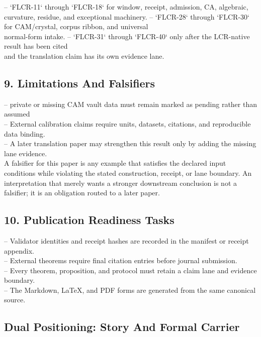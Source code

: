 \documentclass[11pt]{article}
\begin{document}
\noindent{}-- `FLCR-11` through `FLCR-18` for window, receipt, admission, CA, algebraic,\\
  curvature, residue, and exceptional machinery.
\noindent{}-- `FLCR-28` through `FLCR-30` for CAM/crystal, corpus ribbon, and universal\\
  normal-form intake.
\noindent{}-- `FLCR-31` through `FLCR-40` only after the LCR-native result has been cited\\
  and the translation claim has its own evidence lane.

\subsection*{9. Limitations And Falsifiers}

\noindent{}-- private or missing CAM vault data must remain marked as pending rather than assumed\\
\noindent{}-- External calibration claims require units, datasets, citations, and reproducible data binding.\\
\noindent{}-- A later translation paper may strengthen this result only by adding the missing lane evidence.\\

A falsifier for this paper is any example that satisfies the declared input
conditions while violating the stated construction, receipt, or lane boundary.
An interpretation that merely wants a stronger downstream conclusion is not a
falsifier; it is an obligation routed to a later paper.

\subsection*{10. Publication Readiness Tasks}

\noindent{}-- Validator identities and receipt hashes are recorded in the manifest or receipt appendix.\\
\noindent{}-- External theorems require final citation entries before journal submission.\\
\noindent{}-- Every theorem, proposition, and protocol must retain a claim lane and evidence boundary.\\
\noindent{}-- The Markdown, LaTeX, and PDF forms are generated from the same canonical source.\\

\subsection*{Dual Positioning: Story And Formal Carrier}
\end{document}

